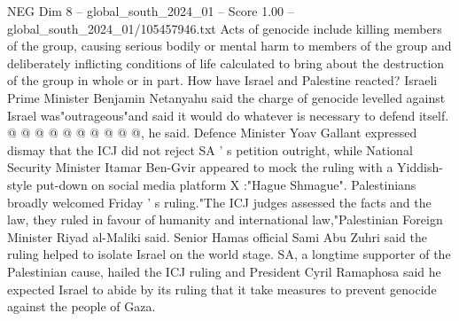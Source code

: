 \begin{textsample}{NEG Dim 8 – global\_south\_2024\_01 – Score 1.00 – global\_south\_2024\_01/105457946.txt}
Acts of genocide include killing members of the group, causing serious bodily or mental harm to members of the group and deliberately inflicting conditions of life calculated to bring about the destruction of the group in whole or in part.
How have Israel and Palestine reacted?
Israeli Prime Minister Benjamin Netanyahu said the charge of genocide levelled against Israel was"outrageous"and said it would do whatever is necessary to defend itself. @ @ @ @ @ @ @ @ @ @, he said.
Defence Minister Yoav Gallant expressed dismay that the ICJ did not reject SA ' s petition outright, while National Security Minister Itamar Ben-Gvir appeared to mock the ruling with a Yiddish-style put-down on social media platform X :"Hague Shmague".
Palestinians broadly welcomed Friday ' s ruling."The ICJ judges assessed the facts and the law, they ruled in favour of humanity and international law,"Palestinian Foreign Minister Riyad al-Maliki said.
Senior Hamas official Sami Abu Zuhri said the ruling helped to isolate Israel on the world stage.
SA, a longtime supporter of the Palestinian cause, hailed the ICJ ruling and President Cyril Ramaphosa said he expected Israel to abide by its ruling that it take measures to prevent genocide against the people of Gaza.

\end{textsample}
